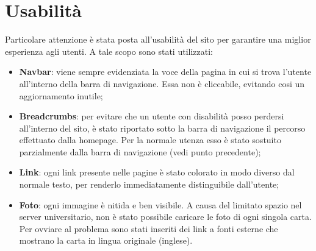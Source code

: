 \section{Usabilità}
Particolare attenzione è stata posta all'usabilità del sito per garantire una miglior esperienza agli utenti. A tale scopo sono stati utilizzati:
\begin{itemize}
	\item \textbf{Navbar}: viene sempre evidenziata la voce della pagina in cui si trova l'utente all'interno della barra di navigazione. Essa non è cliccabile, evitando cosi un aggiornamento inutile;
	\item \textbf{Breadcrumbs}: per evitare che un utente con disabilità posso perdersi all'interno del sito, è stato riportato sotto la barra di navigazione il percorso effettuato dalla homepage. Per la normale utenza esso è stato sostuito parzialmente dalla barra di navigazione (vedi punto precedente);
	\item \textbf{Link}: ogni link presente nelle pagine è stato colorato in modo diverso dal normale testo, per renderlo immediatamente distinguibile dall'utente;
	\item \textbf{Foto}: ogni immagine è nitida e ben visibile. A causa del limitato spazio nel server universitario, non è stato possibile caricare le foto di ogni singola carta. Per ovviare al problema sono stati inseriti dei link a fonti esterne che mostrano la carta in lingua originale (inglese).
\end{itemize}


\newpage